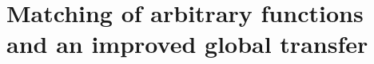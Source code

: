 \begingroup
\providecommand{\ov}{}\renewcommand{\ov}[1]{\overline{#1}}
\providecommand{\A}{}\renewcommand{\A}{\mathbb{A}}
\providecommand{\C}{}\renewcommand{\C}{\mathbb{C}}
\providecommand{\Z}{}\renewcommand{\Z}{\mathbb{Z}}
\providecommand{\cO}{}\renewcommand{\cO}{\mathcal{O}}
\providecommand{\fp}{}\renewcommand{\fp}{\mathfrak{p}}
\providecommand{\gen}{}\renewcommand{\gen}{\mathrm{gen}}
\providecommand{\reg}{}\renewcommand{\reg}{\mathrm{reg}}
\providecommand{\tr}{}\renewcommand{\tr}{\operatorname{tr}}
\providecommand{\Nrd}{}\renewcommand{\Nrd}{\operatorname{Nrd}}
\providecommand{\Ad}{}\renewcommand{\Ad}{\operatorname{Ad}}
\providecommand{\Iso}{}\renewcommand{\Iso}{\operatorname{Iso}}
\providecommand{\vol}{}\renewcommand{\vol}{\operatorname{vol}}
\providecommand{\supp}{}\renewcommand{\supp}{\operatorname{supp}}
\providecommand{\Cent}{}\renewcommand{\Cent}{\operatorname{Cent}}
\providecommand{\GL}{}\renewcommand{\GL}{\mathrm{GL}}
\providecommand{\St}{}\renewcommand{\St}{\mathrm{St}}
\providecommand{\Gb}{}\renewcommand{\Gb}{\ov{G}}
\providecommand{\Zb}{}\renewcommand{\Zb}{\ov{Z}}
\providecommand{\GDb}{}\renewcommand{\GDb}{\ov{G}_D}
\providecommand{\pib}{}\renewcommand{\pib}{\ov{\pi}}
\providecommand{\Eb}{}\renewcommand{\Eb}{\ov{E}}
\providecommand{\Tb}{}\renewcommand{\Tb}{\ov{T}}
\providecommand{\cG}{}\renewcommand{\cG}{\mathcal{G}}
\providecommand{\cGb}{}\renewcommand{\cGb}{\ov{\mathcal{G}}}
\providecommand{\iD}{}\renewcommand{\iD}{\iota_D}
\providecommand{\iG}{}\renewcommand{\iG}{\iota_{\GL}}
\providecommand{\jj}{}\renewcommand{\jj}{\jmath}
\providecommand{\sg}{}\renewcommand{\sg}{\sigma}
\providecommand{\Pv}{}\renewcommand{\Pv}{\textbf{(P)}}
\providecommand{\Ev}{}\renewcommand{\Ev}{\textbf{(E)}}
\providecommand{\Ov}{}\renewcommand{\Ov}{\textbf{(O)}}
\providecommand{\Cv}{}\renewcommand{\Cv}{\textbf{(C)}}
\chapter[Matching of arbitrary functions]{Matching of arbitrary functions and an improved global transfer}\label{ch:II}
